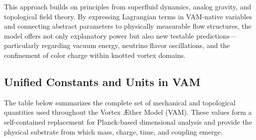 This approach builds on principles from superfluid dynamics, analog gravity, and topological field theory. By expressing Lagrangian terms in VAM-native variables and connecting abstract parameters to physically measurable flow structures, the model offers not only explanatory power but also new testable predictions—particularly regarding vacuum energy, neutrino flavor oscillations, and the confinement of color charge within knotted vortex domains.

\subsection*{Unified Constants and Units in VAM}

The table below summarizes the complete set of mechanical and topological quantities used throughout the Vortex Æther Model (VAM). These values form a self-contained replacement for Planck-based dimensional analysis and provide the physical substrate from which mass, charge, time, and coupling emerge.


